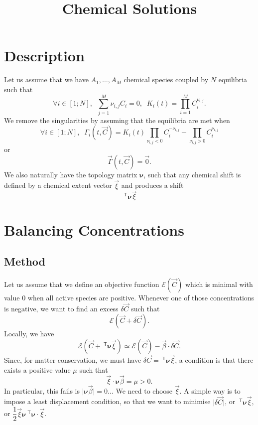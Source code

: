 \documentclass[aps]{revtex4}
\newcommand{\mymat}[1]{\bm{#1}}
\newcommand{\mytrn}[1]{~^{\mathsf{T}}{#1}}
\begin{document}
\title{Chemical Solutions}

\section{Description}
Let us assume that we have $A_1,\ldots,A_M$ chemical species coupled by
$N$ equilibria such that
\begin{equation}
	\forall i \in [1;N], \;\; \sum_{j=1}^{M} \nu_{i,j} C_i = 0, \;\; K_i(t) = \prod_{i=1}^{M} C_i^{\nu_{i,j}}.
\end{equation}
We remove the singularities by assuming that the equilibria are met when
\begin{equation}
	\forall i \in [1;N], \;\; \Gamma_i(t,\vec{C}) = K_i(t) \prod_{\nu_{i,j}<0}  C_i^{-\nu_{i,j}} -  \prod_{\nu_{i,j}>0} C_i^{\nu_{i,j}} 
\end{equation}
or
\begin{equation}
	\vec{\Gamma}(t,\vec{C}) = \vec{0}.
\end{equation}
We also naturally have the topology matrix $\mymat{\nu}$, such that
any chemical shift is defined by a  chemical extent vector $\vec{\xi}$ and
produces a shift
$$
	\mytrn{\mymat{\nu}}\vec{\xi}
$$

\section{Balancing Concentrations}
\subsection{Method}

Let us assume that we define an objective function $\mathcal{E}\left(\vec{C}\right)$ which is minimal with value 0 when all active species are positive. Whenever one of those concentrations is negative, we want to find an excess
$\delta\vec{C}$ such that
\begin{equation}
	\mathcal{E}\left(\vec{C}+\delta\vec{C}\right).
\end{equation}
Locally, we have
\begin{equation}
	\mathcal{E}\left(\vec{C}+\mytrn{\mymat{\nu}}\vec{\xi}\right) \simeq 
	\mathcal{E}\left(\vec{C}\right) - \vec{\beta}\cdot\delta\vec{C}.
\end{equation}
Since, for matter conservation, we must have $\delta\vec{C} = \mytrn{\mymat{\nu}}\vec{\xi}$, 
a condition is that there exists a positive value $\mu$ such that 
\begin{equation}
	\vec{\xi} \cdot \mymat{\nu} \vec{\beta} = \mu > 0 .
\end{equation}
In particular, this fails is $\vert\mymat{\nu} \vec{\beta}\vert=0$...
We need to choose $\vec{\xi}$. A simple way is to impose a least displacement condition, so
that we want to minimise $\vert\delta\vec{C}\vert$, or $\mytrn{\mymat{\nu}}\vec{\xi}$, or
$\dfrac{1}{2}\vec{\xi}\mymat{\nu}\mytrn{\mymat{\nu}}\cdot\vec{\xi}$.
\end{document}
